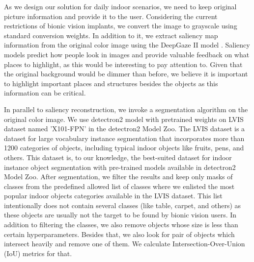 As we design our solution for daily indoor scenarios, we need to keep original picture information and provide it to the user.
Considering the current restrictions of bionic vision implants, we convert the image to grayscale using standard conversion weights. In addition to it, we extract saliency map information from the original color image using the DeepGaze II model \cite{kmmerer2016deepgaze}. Saliency models predict how people look in images and provide valuable feedback on what places to highlight, as this would be interesting to pay attention to. Given that the original background would be dimmer than before, we believe it is important to highlight important places and structures besides the objects as this information can be critical. 

In parallel to saliency reconstruction, we invoke a segmentation algorithm on the original color image. We use detectron2 model \cite{wu2019detectron2} with pretrained weights on LVIS dataset \cite{gupta2019lvis} named 'X101-FPN' in the detectron2 Model Zoo. The LVIS dataset is a dataset for large vocabulary instance segmentation that incorporates more than 1200 categories of objects, including typical indoor objects like fruits, pens, and others. This dataset is, to our knowledge, the best-suited dataset for indoor instance object segmentation with pre-trained models available in detectron2 Model Zoo. After segmentation, we filter the results and keep only masks of classes from the predefined allowed list of classes where we enlisted the most popular indoor objects categories available in the LVIS dataset. This list intentionally does not contain several classes (like table, carpet, and others) as these objects are usually not the target to be found by bionic vision users. In addition to filtering the classes, we also remove objects whose size is less than certain hyperparameters. Besides that, we also look for pair of objects which intersect heavily and remove one of them. We calculate Intersection-Over-Union (IoU) metrics for that.

